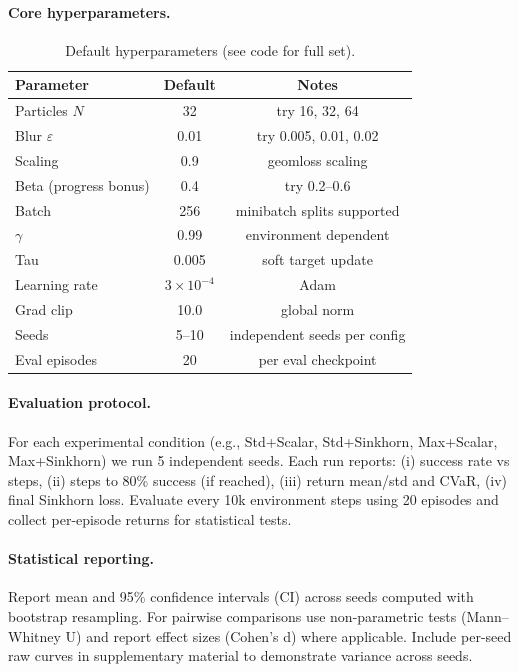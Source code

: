 \documentclass[10pt,twocolumn]{article}
\begin{document}
\paragraph{Core hyperparameters.}
\begin{table}[h!]
\centering
\begin{tabular}{lcc}
\toprule
Parameter & Default & Notes \\
\midrule
Particles $N$ & 32 & try 16, 32, 64 \\
Blur $\varepsilon$ & 0.01 & try 0.005, 0.01, 0.02 \\
Scaling & 0.9 & geomloss scaling \\
Beta (progress bonus) & 0.4 & try 0.2–0.6 \\
Batch & 256 & minibatch splits supported \\
$\gamma$ & 0.99 & environment dependent \\
Tau & 0.005 & soft target update \\
Learning rate & $3\times10^{-4}$ & Adam \\
Grad clip & 10.0 & global norm \\
Seeds & 5--10 & independent seeds per config \\
Eval episodes & 20 & per eval checkpoint \\
\bottomrule
\end{tabular}
\caption{Default hyperparameters (see code for full set).}
\end{table}

\paragraph{Evaluation protocol.} For each experimental condition (e.g., Std+Scalar, Std+Sinkhorn, Max+Scalar, Max+Sinkhorn) we run 5 independent seeds. Each run reports: (i) success rate vs steps, (ii) steps to 80\% success (if reached), (iii) return mean/std and CVaR, (iv) final Sinkhorn loss. Evaluate every 10k environment steps using 20 episodes and collect per-episode returns for statistical tests.

\paragraph{Statistical reporting.} Report mean and 95\% confidence intervals (CI) across seeds computed with bootstrap resampling. For pairwise comparisons use non-parametric tests (Mann–Whitney U) and report effect sizes (Cohen's d) where applicable. Include per-seed raw curves in supplementary material to demonstrate variance across seeds.
\end{document}
